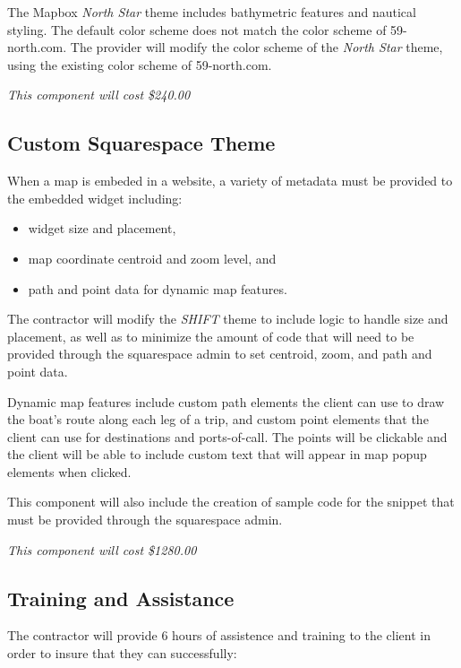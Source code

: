 \documentclass[11pt]{article}
\begin{document}
The Mapbox \emph{North Star} theme includes bathymetric features and
nautical styling. The default color scheme does not match the color
scheme of 59-north.com. The provider will modify the color scheme of
the \emph{North Star} theme, using the existing color scheme of 59-north.com.

\emph{This component will cost \$240.00}

\subsection{Custom Squarespace Theme}

When a map is embeded in a website, a variety of metadata must be
provided to the embedded widget including:

\begin{itemize}

\item widget size and placement,
\item map coordinate centroid and zoom level, and
\item path and point data for dynamic map features.
  
\end{itemize}

The contractor will modify the \emph{SHIFT} theme to include logic to
handle size and placement, as well as to minimize the amount of code
that will need to be provided through the squarespace admin to set
centroid, zoom, and path and point data.

Dynamic map features include custom path elements the client can
use to draw the boat's route along each leg of a trip, and custom point
elements that the client can use for destinations and ports-of-call.
The points will be clickable and the client will be able to include
custom text that will appear in map popup elements when clicked.

This component will also include the creation of sample code for the
snippet that must be provided through the squarespace admin.

\emph{This component will cost \$1280.00}

\subsection{Training and Assistance}

The contractor will provide 6 hours of assistence and training to the
client in order to insure that they can successfully:
\end{document}
